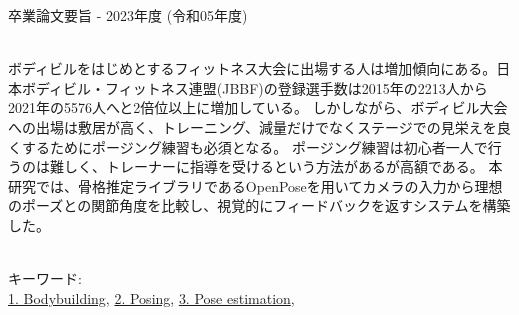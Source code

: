 卒業論文要旨 - 2023年度 (令和05年度)
\begin{center}
\begin{large}
\end{large}
\end{center}

~ \\
  ボディビルをはじめとするフィットネス大会に出場する人は増加傾向にある。日本ボディビル・フィットネス連盟(JBBF)の登録選手数は2015年の2213人から2021年の5576人へと2倍位以上に増加している\cite{jbbf}。
  しかしながら、ボディビル大会への出場は敷居が高く、トレーニング、減量だけでなくステージでの見栄えを良くするためにポージング練習も必須となる。
  ポージング練習は初心者一人で行うのは難しく、トレーナーに指導を受けるという方法があるが高額である。
  本研究では、骨格推定ライブラリであるOpenPoseを用いてカメラの入力から理想のポーズとの関節角度を比較し、視覚的にフィードバックを返すシステムを構築した。

~ \\
キーワード:\\
\underline{1. Bodybuilding},
\underline{2. Posing},
\underline{3. Pose estimation},
\begin{flushright}
\dept \\
\author
\end{flushright}
